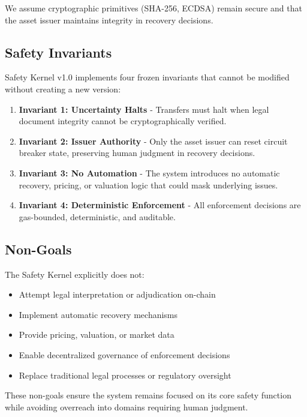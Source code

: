 \documentclass[10pt,conference]{IEEEtran}
\begin{document}
We assume cryptographic primitives (SHA-256, ECDSA) remain secure and that the asset issuer maintains integrity in recovery decisions.

\subsection{Safety Invariants}
\label{subsec:safety_invariants}

Safety Kernel v1.0 implements four frozen invariants that cannot be modified without creating a new version:

\begin{enumerate}
\item \textbf{Invariant 1: Uncertainty Halts} - Transfers must halt when legal document integrity cannot be cryptographically verified.

\item \textbf{Invariant 2: Issuer Authority} - Only the asset issuer can reset circuit breaker state, preserving human judgment in recovery decisions.

\item \textbf{Invariant 3: No Automation} - The system introduces no automatic recovery, pricing, or valuation logic that could mask underlying issues.

\item \textbf{Invariant 4: Deterministic Enforcement} - All enforcement decisions are gas-bounded, deterministic, and auditable.
\end{enumerate}

\subsection{Non-Goals}
\label{subsec:non_goals}

The Safety Kernel explicitly does not:

\begin{itemize}
\item Attempt legal interpretation or adjudication on-chain
\item Implement automatic recovery mechanisms
\item Provide pricing, valuation, or market data
\item Enable decentralized governance of enforcement decisions
\item Replace traditional legal processes or regulatory oversight
\end{itemize}

These non-goals ensure the system remains focused on its core safety function while avoiding overreach into domains requiring human judgment.
\end{document}
